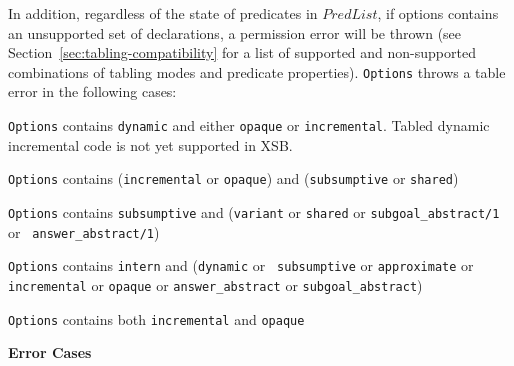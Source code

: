\begin{description}
In addition, regardless of the state of predicates in $PredList$, if
options contains an unsupported set of declarations, a permission
error will be thrown (see Section~\ref{sec:tabling-compatibility} for
a list of supported and non-supported combinations of tabling modes
and predicate properties).  {\tt Options} throws a table error in the
following cases:
%
\bi
\item {\tt Options} contains {\tt dynamic} and either {\tt opaque} or
  {\tt incremental}.  Tabled dynamic incremental code is not yet
  supported in XSB.

\item {\tt Options} contains ({\tt incremental} or {\tt opaque}) and
  ({\tt subsumptive} or {\tt shared})

\item {\tt Options} contains {\tt subsumptive} and ({\tt variant} or
  {\tt shared} or {\tt subgoal\_abstract/1} or {\tt
    answer\_abstract/1})

\item {\tt Options} contains {\tt intern} and ({\tt dynamic} or {\tt
subsumptive} or {\tt approximate} or {\tt incremental} or {\tt opaque}
or {\tt answer\_abstract} or {\tt subgoal\_abstract})
%
%
\item {\tt Options} contains both {\tt incremental} and {\tt opaque}
\ei

{\bf Error Cases}


\end{description}
